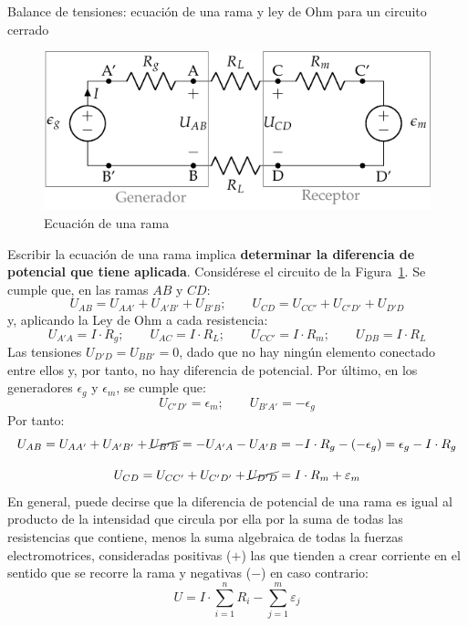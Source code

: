 \documentclass[11pt]{book} %
\makeatletter
\numberwithin{dummy}{section}
\theoremstyle{ocrenumbox}
\theoremstyle{blacknumex}
\theoremstyle{blacknumbox}
\theoremstyle{ocrenum}
\renewcommand{\subsection}{\@startsection {subsection}{2}{\z@}
{-3ex \@plus -0.1ex \@minus -.4ex}
{0.5ex \@plus.2ex }
{\normalfont\sffamily\bfseries}}
\makeatother
\begin{document}
	\subsection{Balance de tensiones: ecuación de una rama y ley de Ohm para un circuito cerrado}
	\begin{figure}[tbp]
		\centering
		\includegraphics[width=0.5\linewidth]{../figs/circuito_lkv.pdf}
		\caption{Ecuación de una rama}
		\label{fig.circuito_lkv}
	\end{figure}
	Escribir la ecuación de una rama implica \textbf{determinar la diferencia de potencial que tiene aplicada}. Considérese el circuito de la Figura~\ref{fig.circuito_lkv}. Se cumple que, en las ramas $AB$ y $CD$: 
	\begin{equation*}
		U_{AB} = U_{AA'} + U_{A'B'} + U_{B'B}; \qquad
		U_{CD} = U_{CC'} + U_{C'D'} + U_{D'D}
	\end{equation*}
	y, aplicando la Ley de Ohm a cada resistencia:
	\begin{equation*}
		U_{A'A} = I \cdot R_g; \qquad
		U_{AC} = I \cdot R_L; \qquad 
		U_{CC'} = I \cdot R_m; \qquad
		U_{DB} = I \cdot R_L
	\end{equation*}
	Las tensiones $U_{D'D}= U_{BB'} = 0$, dado que no hay ningún elemento conectado entre ellos y, por tanto, no hay diferencia de potencial. Por último, en los generadores $\epsilon_g$ y $\epsilon_m$, se cumple que:
	\begin{equation*}
		U_{C'D'} = \epsilon_m;\qquad
		U_{B'A'} = -\epsilon_g
	\end{equation*}
	Por tanto: 
	\begin{equation*}
		U_{AB} = U_{AA'} + U_{A'B'} + \cancel{U_{B'B}}=-U_{A'A}-U_{A'B}=-I \cdot R_g-(-\epsilon_g)=\epsilon_g-I \cdot R_g%
	\end{equation*}
	
	\begin{equation*}
		U_{CD} = U_{CC'} + U_{C'D'} + \cancel{U_{D'D}}=I \cdot R_m +\varepsilon_m%
	\end{equation*}
	En general, puede decirse que la diferencia de potencial de una rama es igual al producto de la intensidad que circula por ella por la suma de todas las resistencias que contiene, menos la suma algebraica de todas la
	fuerzas electromotrices, consideradas positivas ($+$) las que tienden a crear corriente en el sentido que se recorre la rama y negativas ($-$) en caso contrario:
	\begin{equation}\label{eq.ecuacion_rama}
		\boxed{U=I\cdot \sum_{i=1}^n R_i-\sum_{j=1}^m \varepsilon_j}
	\end{equation}
	
\end{document}
